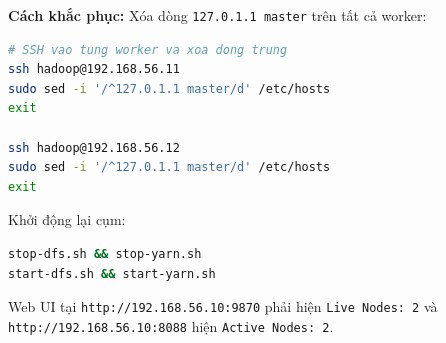 \textbf{Cách khắc phục:} Xóa dòng \texttt{127.0.1.1 master} trên tất cả worker:

\begin{lstlisting}[language=bash, numbers=none]
# SSH vao tung worker va xoa dong trung
ssh hadoop@192.168.56.11
sudo sed -i '/^127.0.1.1 master/d' /etc/hosts
exit

ssh hadoop@192.168.56.12
sudo sed -i '/^127.0.1.1 master/d' /etc/hosts
exit
\end{lstlisting}

Khởi động lại cụm:

\begin{lstlisting}[language=bash, numbers=none]
stop-dfs.sh && stop-yarn.sh
start-dfs.sh && start-yarn.sh
\end{lstlisting}

Web UI tại \texttt{http://192.168.56.10:9870} phải hiện \texttt{Live Nodes: 2} và \texttt{http://192.168.56.10:8088} hiện \texttt{Active Nodes: 2}.
